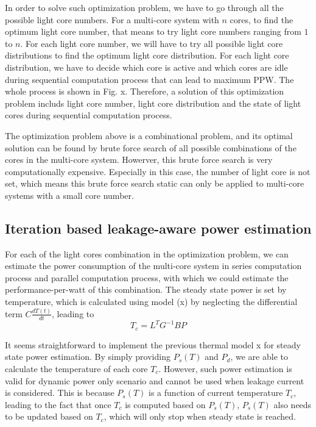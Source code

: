 In order to solve such optimization problem, we have to go through all the possible light core numbers. For a multi-core system with $n$ cores, to find the optimum light core number, that means to try light core numbers ranging from $1$ to $n$. For each light core number, we will have to try all possible light core distributions to find the optimum light core distribution. For each light core distribution, we have to decide which core is active and which cores are idle during sequential computation process that can lead to maximum PPW. The whole process is shown in Fig. x. Therefore, a solution of this optimization problem includs light core number, light core distribution and the state of light cores during sequential computation process. 

The optimization problem above is a combinational problem, and its optimal solution can be found by brute force search of all possible combinations of the cores in the multi-core system. Howerver, this brute force search is very computationally expensive. Especially in this case, the number of light core is not set, which means this brute force search static can only be applied to multi-core systems with a small core number. 

\subsection{Iteration based leakage-aware power estimation}
For each of the light cores combination in the optimization problem, we can estimate the power consumption of the multi-core system in series computation process and parallel computation process, with which we could estimate the performance-per-watt of this combination. The steady state power is set by temperature, which is calculated using model (x) by neglecting the differential term $C\frac{dT(t)}{dt}$, leading to
\begin{equation}\label{steady_state_temperature}
T_{c} = L^{T}G^{-1}BP
\end{equation}

It seems straightforward to implement the previous thermal model x for steady state power estimation. By simply providing $P_s(T)$ and $P_d$, we are able to calculate the temperature of each core $T_{c}$. However, such power estimation is valid for dynamic power only scenario and cannot be used when leakage current is considered. This is because $P_{s}(T)$ is a function of current temperature $T_{c}$, leading to the fact that once $T_{c}$ is computed based on $P_{s}(T)$, $P_{s}(T)$ also needs to be updated based on $T_{c}$, which will only stop when steady state is reached.



